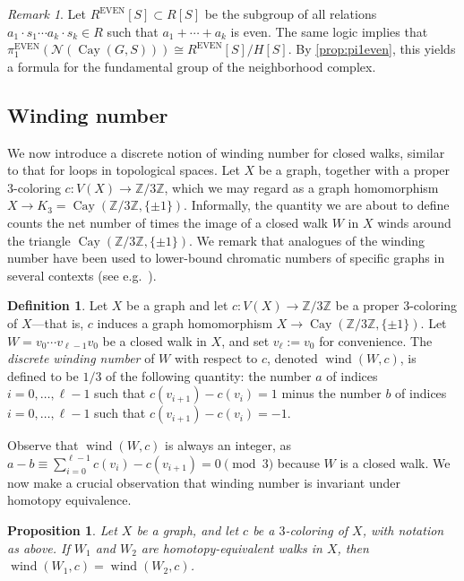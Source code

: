 \documentclass[12pt,letterpaper]{amsart}
\newtheorem{proposition}[theorem]{Proposition}
\theoremstyle{definition}
\newtheorem{definition}[theorem]{Definition}
\theoremstyle{remark}
\newtheorem{remark}[theorem]{Remark}
\newcommand{\N}{{\mathcal N}}
\newcommand{\Z}{{\mathbb Z}}
\newcommand{\pieven}{\pi_1^{\mathrm{EVEN}}}
\DeclareMathOperator{\Cay}{Cay}
\DeclareMathOperator{\wind}{wind}
\begin{document}
\begin{remark}
Let $R^\mathrm{EVEN}[S]\subset R[S]$ be the subgroup of all relations $a_1\cdot s_1\cdots a_k\cdot s_k\in R$ such that $a_1+\cdots+a_k$ is even. The same logic implies that $\pieven(\N(\Cay(G,S)))\cong R^{\mathrm{EVEN}}[S]/H[S]$. By \cref{prop:pi1even}, this yields a formula for the fundamental group of the neighborhood complex.
\end{remark}




\subsection{Winding number}
We now introduce a discrete notion of winding number for closed walks, similar to that for loops in topological spaces.  Let $X$ be a graph, together with a proper 3-coloring $c:V(X)\to \Z/3\Z$, which we may regard as a graph homomorphism $X\to K_3=\Cay(\mathbb{Z}/3\mathbb{Z},\{\pm 1\})$. Informally, the quantity we are about to define counts the net number of times the image of a closed walk $W$ in $X$ winds around the triangle $\Cay(\mathbb{Z}/3\mathbb{Z},\{\pm 1\})$.  We remark that analogues of the winding number have been used to lower-bound chromatic numbers of specific graphs in several contexts (see e.g.\ \cite{Arc,GuNaTa, Moh, Pay,Sim}).

\begin{definition}\label{def:wind}
Let $X$ be a graph and let $c:V(X)\to\mathbb{Z}/3\mathbb{Z}$ be a proper 3-coloring of $X$---that is, $c$ induces a graph homomorphism $X\to\Cay(\mathbb{Z}/3\mathbb{Z},\{\pm 1\})$. Let $W=v_0\cdots v_{\ell-1}v_0$ be a closed walk in $X$, and set $v_\ell:=v_0$ for convenience. The \emph{discrete winding number} of $W$ with respect to $c$, denoted $\wind(W,c)$, is defined to be $1/3$ of the following quantity: the number $a$ of indices $i=0,\dots,{\ell-1}$ such that $c(v_{i+1})-c(v_i)=1$ minus the number $b$ of indices $i=0,\dots,{\ell-1}$ such that $c(v_{i+1})-c(v_i)=-1$.
\end{definition}

Observe that $\wind(W,c)$ is always an integer, as $a-b\equiv\sum_{i=0}^{\ell-1} c(v_i)-c(v_{i+1})= 0\pmod 3$ because $W$ is a closed walk. 
We now make a crucial observation that winding number is invariant under homotopy equivalence.


\begin{proposition}\label{prop:winding-homotopy}
Let $X$ be a graph, and let $c$ be a $3$-coloring of $X$, with notation as above. If $W_1$ and $W_2$ are homotopy-equivalent walks in $X$, then $\wind(W_1,c)=\wind(W_2,c)$.
\end{proposition}
\end{document}
